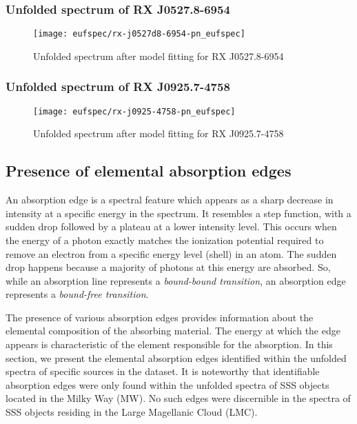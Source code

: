 			\subsubsection*{Unfolded spectrum of RX J0527.8-6954}
				\begin{figure}[h!]
					\centering
					\texttt{[image: eufspec/rx-j0527d8-6954-pn\_eufspec]}
					\caption{Unfolded spectrum after model fitting for RX J0527.8-6954}
					\label{result:euf-rx-j0527}
				\end{figure}
			
			\newpage
			\subsubsection*{Unfolded spectrum of RX J0925.7-4758}
				\begin{figure}[h!]
					\centering
					\texttt{[image: eufspec/rx-j0925-4758-pn\_eufspec]}
					\caption{Unfolded spectrum after model fitting for RX J0925.7-4758}
					\label{result:euf-rx-j0925}
				\end{figure}
			
		
		\subsection{Presence of elemental absorption edges}
			An absorption edge is a spectral feature which appears as a sharp decrease in intensity at a specific energy in the spectrum. It resembles a step function, with a sudden drop followed by a plateau at a lower intensity level. This occurs when the energy of a photon exactly matches the ionization potential required to remove an electron from a specific energy level (shell) in an atom. The sudden drop happens because a majority of photons at this energy are absorbed. So, while an absorption line represents a \textit{bound-bound transition}, an absorption edge represents a \textit{bound-free transition}.
			
			The presence of various absorption edges provides information about the elemental composition of the absorbing material. The energy at which the edge appears is characteristic of the element responsible for the absorption. In this section, we present the elemental absorption edges identified within the unfolded spectra of specific sources in the dataset. It is noteworthy that identifiable absorption edges were only found within the unfolded spectra of SSS objects located in the Milky Way (MW). No such edges were discernible in the spectra of SSS objects residing in the Large Magellanic Cloud (LMC).
		
